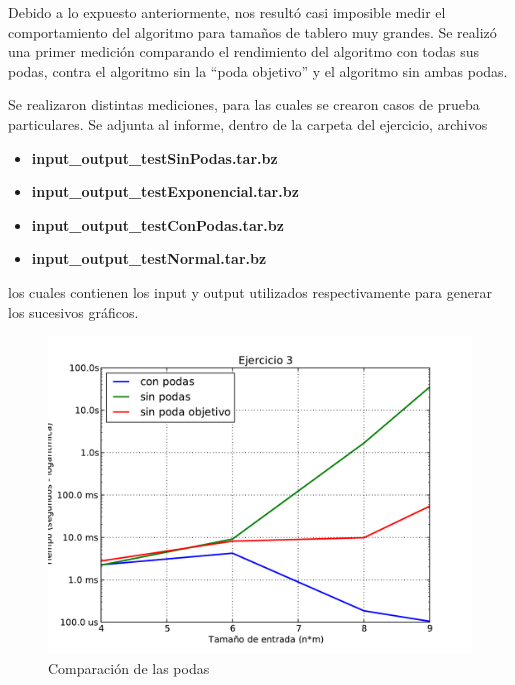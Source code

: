 \documentclass[11pt, a4paper, twoside]{article}
\begin{document}
Debido a lo expuesto anteriormente, nos resultó casi imposible medir el
comportamiento del algoritmo para tamaños de tablero muy grandes. Se realizó una
primer medición comparando el rendimiento del algoritmo con todas sus podas,
contra el algoritmo sin la ``poda objetivo'' y el algoritmo sin ambas podas.

Se realizaron distintas mediciones, para las cuales se crearon casos de prueba
particulares. Se adjunta al informe, dentro de la carpeta del ejercicio,
archivos 
\begin{itemize}
\item \textbf{input\_output\_testSinPodas.tar.bz}
\item \textbf{input\_output\_testExponencial.tar.bz}
\item \textbf{input\_output\_testConPodas.tar.bz}
\item \textbf{input\_output\_testNormal.tar.bz} 
\end{itemize}
los cuales contienen los input y
output utilizados respectivamente para generar los sucesivos gráficos.


\begin{figure}[h]
   \begin{center}
   \includegraphics[width=1\textwidth,angle=0]{../ej3/graficos/test_sinPodas.pdf}
   \caption{Comparación de las podas}
   \label{fig:ej3-1}
   \end{center}
\end{figure}
\end{document}
